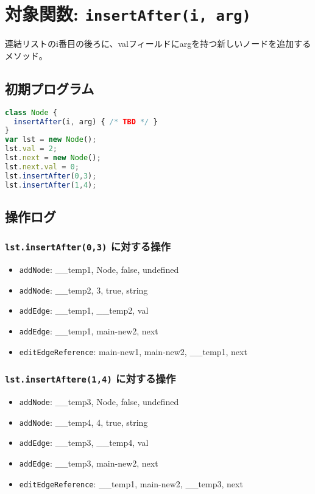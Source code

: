 \documentclass{article}
\begin{document}






\section{対象関数: \texttt{insertAfter(i, arg)}}
連結リストのi番目の後ろに、valフィールドにargを持つ新しいノードを追加するメソッド。


\subsection{初期プログラム}

\begin{lstlisting}[language=JavaScript]
class Node {
  insertAfter(i, arg) { /* TBD */ }
}
var lst = new Node(); 
lst.val = 2;
lst.next = new Node();
lst.next.val = 0;
lst.insertAfter(0,3);
lst.insertAfter(1,4);
\end{lstlisting}

\subsection{操作ログ}

\subsubsection{\texttt{lst.insertAfter(0,3)} に対する操作}
\begin{itemize}
  \item \texttt{addNode}: \_\_temp1, Node, false, undefined
  \item \texttt{addNode}: \_\_temp2, 3, true, string
  \item \texttt{addEdge}: \_\_temp1, \_\_temp2, val
  \item \texttt{addEdge}: \_\_temp1, main-new2, next
  \item \texttt{editEdgeReference}: main-new1, main-new2, \_\_temp1, next
\end{itemize}

\subsubsection{\texttt{lst.insertAftere(1,4)} に対する操作}
\begin{itemize}
  \item \texttt{addNode}: \_\_temp3, Node, false, undefined
  \item \texttt{addNode}: \_\_temp4, 4, true, string
  \item \texttt{addEdge}: \_\_temp3, \_\_temp4, val
  \item \texttt{addEdge}: \_\_temp3, main-new2, next
  \item \texttt{editEdgeReference}: \_\_temp1, main-new2, \_\_temp3, next
\end{itemize}
\end{document}
